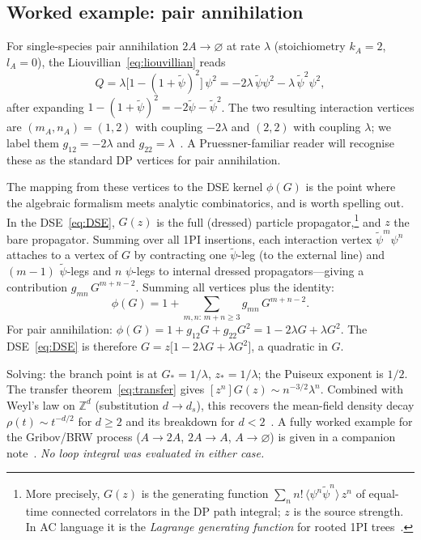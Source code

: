 \documentclass[11pt,a4paper]{article}
\newcommand{\psit}{\tilde\psi}
\theoremstyle{plain}
\begin{document}
\subsection{Worked example: pair annihilation}
\label{sec:worked}

For single-species pair annihilation $2A \to \varnothing$ at rate
$\lambda$ (stoichiometry $k_A{=}2$, $l_A{=}0$),
the Liouvillian~\eqref{eq:liouvillian} reads
\begin{equation}
  Q = \lambda\bigl[1 - (1+\psit)^2\bigr]\,\psi^2
  = -2\lambda\,\psit\psi^2 - \lambda\,\psit^2\psi^2,
\end{equation}
after expanding $1 - (1+\psit)^2 = -2\psit - \psit^2$.  The two
resulting interaction vertices are $(m_A, n_A) = (1, 2)$ with
coupling $-2\lambda$ and $(2, 2)$ with coupling $\lambda$; we
label them $g_{12} = -2\lambda$ and $g_{22} =
\lambda$~\citep{Doi1976,Peliti1985}.  A Pruessner-familiar reader
will recognise these as the standard DP vertices for pair
annihilation.

The mapping from these vertices to the DSE kernel $\phi(G)$
is the point where the algebraic formalism meets analytic
combinatorics, and is worth spelling out.  In the DSE~\eqref{eq:DSE},
$G(z)$ is the full (dressed) particle propagator,\footnote{More
precisely, $G(z)$ is the generating function
$\sum_n n!\,\langle\psi^n\psit^n\rangle\,z^n$ of equal-time connected
correlators in the DP path integral; $z$ is the source strength.
In AC language it is the \emph{Lagrange generating function} for
rooted 1PI trees~\citep{FlajoletSedgewick,BognerWeinzierl}.}
and $z$ the bare propagator.  Summing over all 1PI insertions,
each interaction vertex $\psit^m\psi^n$ attaches to a vertex of
$G$ by contracting one $\psit$-leg (to the external line) and
$(m-1)$ $\psit$-legs and $n$ $\psi$-legs to internal dressed
propagators---giving a contribution $g_{mn}\,G^{m+n-2}$.  Summing
all vertices plus the identity:
\begin{equation}\label{eq:phi-from-vertices}
  \phi(G) = 1 + \sum_{m,n:\,m+n\geq 3} g_{mn}\,G^{m+n-2}.
\end{equation}
For pair annihilation: $\phi(G) = 1 + g_{12}G + g_{22}G^2 =
1 - 2\lambda G + \lambda G^2$.  The DSE~\eqref{eq:DSE} is
therefore $G = z\bigl[1 - 2\lambda G + \lambda G^2\bigr]$, a
quadratic in $G$.

Solving: the branch point is at $G_* = 1/\lambda$,
$z_* = 1/\lambda$; the Puiseux exponent is $1/2$.  The transfer
theorem~\eqref{eq:transfer} gives $[z^n]G(z) \sim
n^{-3/2}\lambda^n$.  Combined with Weyl's law on $\mathbb{Z}^d$
(substitution $d \to d_s$), this recovers the mean-field density
decay $\rho(t) \sim t^{-d/2}$ for $d \geq 2$ and its breakdown
for $d < 2$~\citep{Tauber}.  A fully worked example for the
Gribov/BRW process ($A \to 2A$, $2A \to A$, $A \to \varnothing$)
is given in a companion note~\citep{AmarteifioBRW}.  \emph{No
loop integral was evaluated in either case.}
\end{document}
